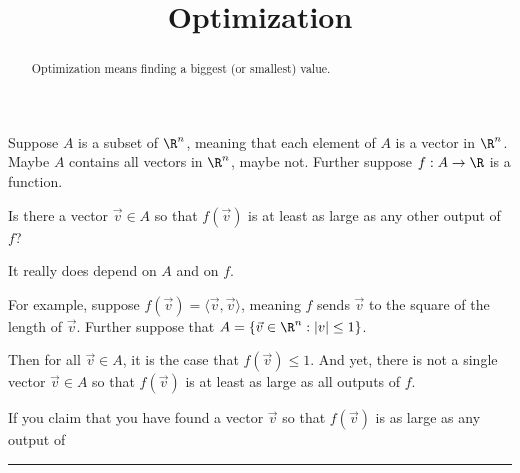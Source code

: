\documentclass{ximera}
\title{Optimization}
\begin{document}
\begin{abstract}
  Optimization means finding a biggest (or smallest) value.
\end{abstract}

Suppose $A$ is a subset of $\R^n$, meaning that each element of $A$ is
a vector in $\R^n$.  Maybe $A$ contains all vectors in $\R^n$, maybe
not.  Further suppose $f : A \to \R$ is a function.

\begin{question}
  Is there a vector $\vec{v} \in A$ so that $f(\vec{v})$ is at least
  as large as any other output of $f$?

  \begin{solution}
    \begin{multiple-choice}
    \end{multiple-choice}
  \end{solution}

  It really does depend on $A$ and on $f$.

  For example, suppose $f(\vec{v}) = \langle \vec{v}, \vec{v}
  \rangle$, meaning $f$ sends $\vec{v}$ to the square of the length of
  $\vec{v}$.  Further suppose that $A = \{ \vec{v} \in \R^n : |v| \le
  1 \}$.

  Then for all $\vec{v} \in A$, it is the case that $f(\vec{v}) \le
  1$.  And yet, there is not a single vector $\vec{v} \in A$ so that
  $f(\vec{v})$ is at least as large as all outputs of $f$.

  If you claim that you have found a vector $\vec{v}$ so that
  $f(\vec{v})$ is as large as any output of
\end{question}

\hrule
\end{document}
